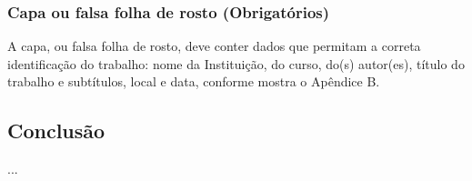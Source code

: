 \documentclass[a4paper,12pt]{article}  %
\begin{document}
\begin{ElementosTextuais}
\begin{Desenvolvimento}
\subsubsection{Capa ou falsa folha de rosto (Obrigatórios)}
A capa, ou falsa folha de rosto, deve conter dados que permitam a correta identificação do trabalho: nome da Instituição, do curso, do(s) autor(es), título do trabalho e subtítulos, local e data, conforme mostra o Apêndice B.


\end{Desenvolvimento}

\begin{Conclusao} %

\section{Conclusão}
...

\end{Conclusao}

\end{ElementosTextuais}

\begin{ElementosPosTextuais}
\begin{Referencias} %
\end{Referencias}

\begin{Glossario} %
\end{Glossario}

\begin{Apendice} %
\end{Apendice}

\begin{Anexo} %
\end{Anexo}

\begin{Indice} %
\end{Indice}

\end{ElementosPosTextuais}
\end{document}

